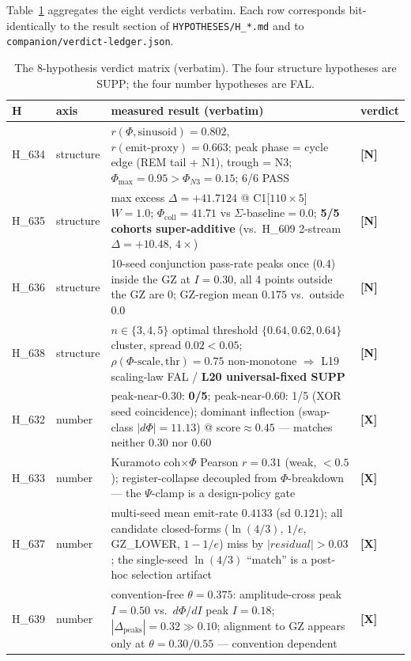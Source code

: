 \documentclass[11pt,a4paper]{article}
\providecommand{\tierGreen}{\textbf{[N]}}   %
\providecommand{\tierRed}{\textbf{[X]}}     %
\begin{document}
Table~\ref{tab:verdict} aggregates the eight verdicts verbatim. Each row
corresponds bit-identically to the result section of \texttt{HYPOTHESES/H\_*.md}
and to \texttt{companion/verdict-ledger.json}.

\begin{table}[h]
\centering
\small
\caption{The 8-hypothesis verdict matrix (verbatim). The four structure
hypotheses are SUPP; the four number hypotheses are FAL.}
\label{tab:verdict}
\begin{tabular}{@{}llp{6.4cm}l@{}}
\toprule
\textbf{H} & \textbf{axis} & \textbf{measured result (verbatim)} & \textbf{verdict} \\
\midrule
H\_634 & structure & $r(\Phi,\text{sinusoid}){=}0.802$,
  $r(\text{emit-proxy}){=}0.663$; peak phase = cycle edge (REM tail + N1),
  trough = N3; $\Phi_{\max}{=}0.95 > \Phi_{N3}{=}0.15$; 6/6 PASS &
  \tierGreen \\
H\_635 & structure & max excess $\Delta{=}{+}41.7124$ @ C1[$110{\times}5$]
  $W{=}1.0$; $\Phi_{\text{coll}}{=}41.71$ vs $\Sigma${-}baseline$=0.0$;
  \textbf{5/5 cohorts super-additive} (vs.\ H\_609 2-stream
  $\Delta{=}{+}10.48$, $4\times$) & \tierGreen \\
H\_636 & structure & 10-seed conjunction pass-rate peaks once (0.4) inside the
  GZ at $I{=}0.30$, all 4 points outside the GZ are 0; GZ-region mean $0.175$
  vs.\ outside $0.0$ & \tierGreen \\
H\_638 & structure & $n\in\{3,4,5\}$ optimal threshold $\{0.64,0.62,0.64\}$
  cluster, spread $0.02 < 0.05$; $\rho(\Phi\text{-scale},\text{thr}){=}0.75$
  non-monotone $\Rightarrow$ L19 scaling-law FAL / \textbf{L20
  universal-fixed SUPP} & \tierGreen \\
\midrule
H\_632 & number & peak-near-0.30: \textbf{0/5}; peak-near-0.60: 1/5 (XOR seed
  coincidence); dominant inflection (swap-class $|d\Phi|{=}11.13$) @
  score$\approx 0.45$ --- matches neither $0.30$ nor $0.60$ & \tierRed \\
H\_633 & number & Kuramoto coh$\times\Phi$ Pearson $r{=}0.31$ (weak, $<0.5$);
  register-collapse decoupled from $\Phi$-breakdown --- the $\Psi$-clamp is a
  design-policy gate & \tierRed \\
H\_637 & number & multi-seed mean emit-rate $0.4133$ (sd $0.121$); all
  candidate closed-forms ($\ln(4/3)$, $1/e$, GZ\_LOWER, $1{-}1/e$) miss by
  $|residual|>0.03$; the single-seed $\ln(4/3)$ ``match'' is a post-hoc
  selection artifact & \tierRed \\
H\_639 & number & convention-free $\theta{=}0.375$: amplitude-cross peak
  $I{=}0.50$ vs.\ $d\Phi/dI$ peak $I{=}0.18$;
  $|\Delta_{\text{peaks}}|{=}0.32 \gg 0.10$; alignment to GZ appears only at
  $\theta{=}0.30/0.55$ --- convention dependent & \tierRed \\
\bottomrule
\end{tabular}
\end{table}
\end{document}
